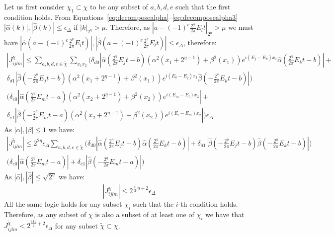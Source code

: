 \documentclass[aps,floatfix,10pt,amssymb,amsfont,amsmath,superscriptaddress,float,nofootinbib,longbibliography,nobalancelastpage,twocolumn]{revtex4-2}
\begin{document}
Let us first consider $\chi_1 \subset \chi$ to be any subset of $a,b,d,e$ such that the first condition holds. From Equations~\eqref{eq:decomposealpha}--\eqref{eq:decomposealpha3} $|\hat \alpha(k)|, |\hat \beta(k)| \leq \epsilon_{\Delta}$ if $|k|_{2^{\eta}} > \mu$. Therefore, as $|a-(-1)^e\frac{2^{\eta}}{2\pi}E_lt|_{2^{\eta}} > \mu$ we must have $|\hat \alpha(a-(-1)^e\frac{2^{\eta}}{2\pi}E_lt)|,|\hat \beta(a-(-1)^e\frac{2^{\eta}}{2\pi}E_lt)|  \leq \epsilon_{\Delta}$, therefore:
\begin{multline}
    |J_{ijlm}^{\tilde\chi}|\leq \sum_{a,b,d,e\in \tilde \chi} \sum_{x_1x_2} \bigg(\delta_{d0}|\hat \alpha(\frac{2^{\eta}}{2\pi}E_jt-b)(\alpha^2(x_1 + 2^{\eta-1}) + \beta^2(x_1))e^{i(E_j-E_k)x_1}\hat \alpha(\frac{2^{\eta}}{2\pi}E_kt-b)|
    +\\\delta_{d1}|\hat \beta(-\frac{2^{\eta}}{2\pi}E_jt-b)(\alpha^2(x_1 + 2^{\eta-1}) + \beta^2(x_1))e^{i(E_k-E_j)x_1}\hat \beta(-\frac{2^{\eta}}{2\pi}E_kt-b)|\bigg)
    \\
    \bigg(\delta_{e0}|\hat \alpha(\frac{2^{\eta}}{2\pi}E_mt-a)(\alpha^2(x_2 + 2^{\eta-1}) + \beta^2(x_2))e^{i(E_m-E_l)x_2}|
    +\\\delta_{e1}|\hat \beta(-\frac{2^{\eta}}{2\pi}E_mt-a)(\alpha^2(x_2 + 2^{\eta-1}) + \beta^2(x_2))e^{i(E_l-E_m)x_2}|\bigg)\epsilon_{\Delta}
\end{multline}
As $|\alpha|, |\beta| \leq 1$ we have:
\begin{multline}
    |J_{ijlm}^{\tilde\chi}|\leq 2^{2\eta}\epsilon_{\Delta}\sum_{a,b,d,e\in \tilde \chi}  \bigg(\delta_{d0}|\hat \alpha(\frac{2^{\eta}}{2\pi}E_jt-b)\hat \alpha(\frac{2^{\eta}}{2\pi}E_kt-b)|
    +\delta_{d1}|\hat \beta(-\frac{2^{\eta}}{2\pi}E_jt-b)\hat \beta(-\frac{2^{\eta}}{2\pi}E_kt-b)|\bigg)
    \\
    \bigg(\delta_{e0}|\hat \alpha(\frac{2^{\eta}}{2\pi}E_mt-a)|
    +\delta_{e1}|\hat \beta(-\frac{2^{\eta}}{2\pi}E_mt-a)|\bigg)
\end{multline}
As $|\hat \alpha|, |\hat \beta| \leq \sqrt{2^{\eta}}$ we have:
\begin{equation}
    |J_{ijlm}^{\tilde\chi}|\leq 2^{\frac{11}{2}\eta+2}\epsilon_{\Delta}
\end{equation}
All the same logic holds for any subset $\chi_i$ such that the $i$-th condition holds. Therefore, as any subset of $\chi$ is also a subset of at least one of $\chi_i$ we have that $J_{ijlm}^{\tilde \chi} < 2^{\frac{11 \eta}{2}+2}\epsilon_{\Delta}$ for any subset $\tilde \chi \subset\chi$.
\end{document}
